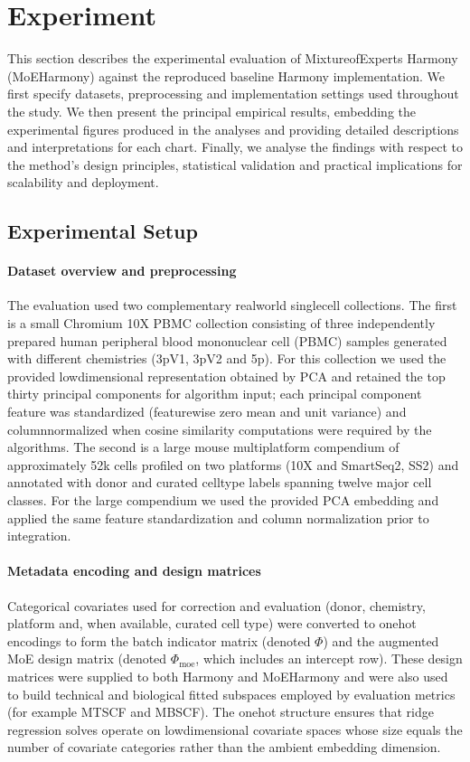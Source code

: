 \documentclass{article}
\begin{document}
\section*{Experiment}

This section describes the experimental evaluation of Mixture\-of\-Experts Harmony (MoE\-Harmony) against the reproduced baseline Harmony implementation. We first specify datasets, preprocessing and implementation settings used throughout the study. We then present the principal empirical results, embedding the experimental figures produced in the analyses and providing detailed descriptions and interpretations for each chart. Finally, we analyse the findings with respect to the method’s design principles, statistical validation and practical implications for scalability and deployment.

\subsection*{Experimental Setup}

\paragraph{Dataset overview and preprocessing} The evaluation used two complementary real\-world single\-cell collections. The first is a small Chromium 10X PBMC collection consisting of three independently prepared human peripheral blood mononuclear cell (PBMC) samples generated with different chemistries (3pV1, 3pV2 and 5p). For this collection we used the provided low\-dimensional representation obtained by PCA and retained the top thirty principal components for algorithm input; each principal component feature was standardized (feature\-wise zero mean and unit variance) and column\-normalized when cosine similarity computations were required by the algorithms. The second is a large mouse multi\-platform compendium of approximately 52k cells profiled on two platforms (10X and Smart\-Seq2, SS2) and annotated with donor and curated cell\-type labels spanning twelve major cell classes. For the large compendium we used the provided PCA embedding and applied the same feature standardization and column normalization prior to integration.

\paragraph{Metadata encoding and design matrices} Categorical covariates used for correction and evaluation (donor, chemistry, platform and, when available, curated cell type) were converted to one\-hot encodings to form the batch indicator matrix (denoted $\Phi$) and the augmented MoE design matrix (denoted $\Phi_{\text{moe}}$, which includes an intercept row). These design matrices were supplied to both Harmony and MoE\-Harmony and were also used to build technical and biological fitted subspaces employed by evaluation metrics (for example MTSCF and MBSCF). The one\-hot structure ensures that ridge regression solves operate on low\-dimensional covariate spaces whose size equals the number of covariate categories rather than the ambient embedding dimension.
\end{document}
